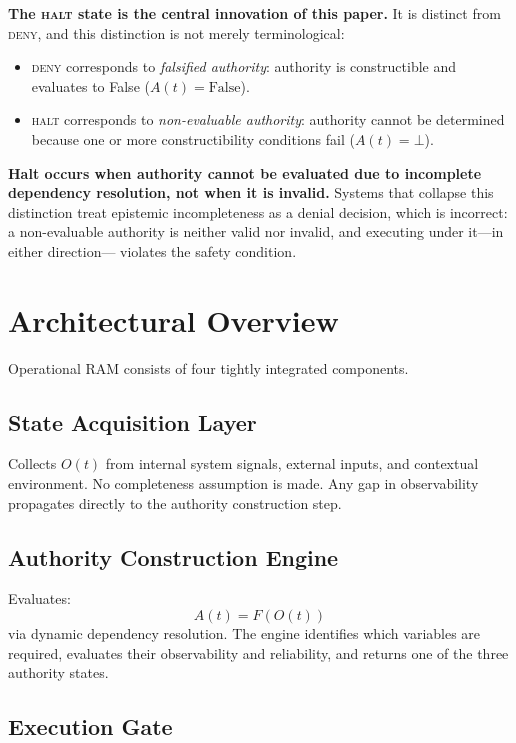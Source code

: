 \documentclass[11pt]{article}
\begin{document}
\textbf{The \textsc{halt} state is the central innovation of this paper.} It is distinct
from \textsc{deny}, and this distinction is not merely terminological:
\begin{itemize}
  \item \textsc{deny} corresponds to \emph{falsified authority}: authority is constructible
        and evaluates to False ($A(t) = \mathrm{False}$).
  \item \textsc{halt} corresponds to \emph{non-evaluable authority}: authority cannot be
        determined because one or more constructibility conditions fail ($A(t) = \bot$).
\end{itemize}
\textbf{Halt occurs when authority cannot be evaluated due to incomplete dependency
resolution, not when it is invalid.} Systems that collapse this distinction treat
epistemic incompleteness as a denial decision, which is incorrect: a non-evaluable
authority is neither valid nor invalid, and executing under it---in either direction---
violates the safety condition.

\section{Architectural Overview}

Operational RAM consists of four tightly integrated components.

\subsection{State Acquisition Layer}

Collects $O(t)$ from internal system signals, external inputs, and contextual environment.
No completeness assumption is made. Any gap in observability propagates directly to the
authority construction step.

\subsection{Authority Construction Engine}

Evaluates:
\[
  A(t) = F(O(t))
\]
via dynamic dependency resolution. The engine identifies which variables are required,
evaluates their observability and reliability, and returns one of the three authority
states.

\subsection{Execution Gate}
\end{document}

